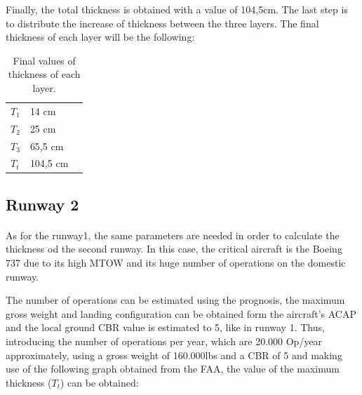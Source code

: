 		Finally, the total thickness is obtained with a value of 104,5cm. The last step is to distribute the increase of thickness between the three layers. The final thickness of each layer will be the following:
		
		\begin{table}[htb]
			\centering
			\begin{tabular}{ll p{5cm}}
				\midrule[2pt]
				\(T_1\)& 14 cm\\
				\(T_2\) & 25 cm\\
				\(T_3\)& 65,5 cm \\
				\(T_t\)& 104,5 cm\\
				\bottomrule[2pt]
			\end{tabular}
			\caption{Final values of thickness of each layer.}
			\label{}
		\end{table}
		
		\subsection{Runway 2}
		\paragraph{}As for the runway1, the same parameters are needed in order to calculate the thickness od the second runway. In this case, the critical aircraft is the Boeing 737 due to its high MTOW and its huge number of operations on the domestic runway.
		
		The number of operations can be estimated using the prognosis, the maximum gross weight and landing configuration can be obtained form the aircraft's ACAP and the local ground CBR value is estimated to 5, like in runway 1. Thus, introducing the number of operations per year, which are 20.000 Op/year approximately, using a gross weight of 160.000lbs and a CBR of 5 and making use of the following graph obtained from the FAA, the value of the maximum thickness (\(T_{t}\)) can be obtained:
		
